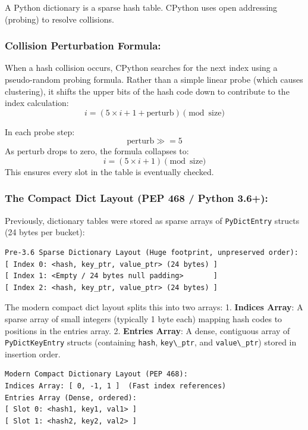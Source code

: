 A Python dictionary is a sparse hash table. CPython uses open addressing
(probing) to resolve collisions.

\hypertarget{collision-perturbation-formula}{%
\subsubsection{Collision Perturbation
Formula:}\label{collision-perturbation-formula}}

When a hash collision occurs, CPython searches for the next index using
a pseudo-random probing formula. Rather than a simple linear probe
(which causes clustering), it shifts the upper bits of the hash code
down to contribute to the index calculation:
\[i = (5 \times i + 1 + \text{perturb}) \pmod{\text{size}}\]

In each probe step: \[\text{perturb} \gg= 5\] As \(\text{perturb}\)
drops to zero, the formula collapses to:
\[i = (5 \times i + 1) \pmod{\text{size}}\] This ensures every slot in
the table is eventually checked.

\hypertarget{the-compact-dict-layout-pep-468-python-3.6}{%
\subsubsection{The Compact Dict Layout (PEP 468 / Python
3.6+):}\label{the-compact-dict-layout-pep-468-python-3.6}}

Previously, dictionary tables were stored as sparse arrays of
\passthrough{\lstinline!PyDictEntry!} structs (24 bytes per bucket):

\begin{lstlisting}
Pre-3.6 Sparse Dictionary Layout (Huge footprint, unpreserved order):
[ Index 0: <hash, key_ptr, value_ptr> (24 bytes) ]
[ Index 1: <Empty / 24 bytes null padding>       ]
[ Index 2: <hash, key_ptr, value_ptr> (24 bytes) ]
\end{lstlisting}

The modern compact dict layout splits this into two arrays: 1.
\textbf{Indices Array}: A sparse array of small integers (typically 1
byte each) mapping hash codes to positions in the entries array. 2.
\textbf{Entries Array}: A dense, contiguous array of
\passthrough{\lstinline!PyDictKeyEntry!} structs (containing
\passthrough{\lstinline!hash!}, \passthrough{\lstinline!key\_ptr!}, and
\passthrough{\lstinline!value\_ptr!}) stored in insertion order.

\begin{lstlisting}
Modern Compact Dictionary Layout (PEP 468):
Indices Array: [ 0, -1, 1 ]  (Fast index references)
Entries Array (Dense, ordered):
[ Slot 0: <hash1, key1, val1> ]
[ Slot 1: <hash2, key2, val2> ]
\end{lstlisting}

